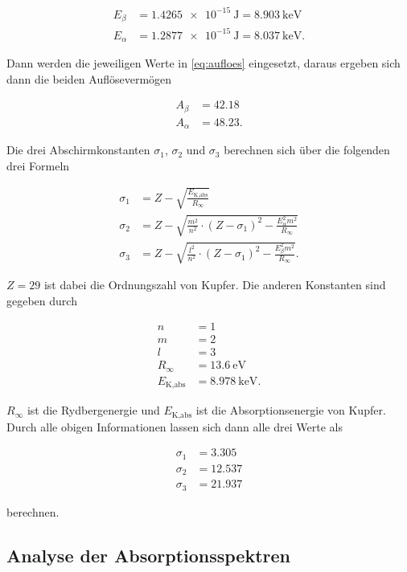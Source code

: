 \begin{align*}
    E_ \beta  &= \SI{1.4265e-15}{\joule} = \SI{8.903}{\kilo\electronvolt}\\
    E_ \alpha &= \SI{1.2877e-15}{\joule} = \SI{8.037}{\kilo\electronvolt}.
\end{align*}

Dann werden die jeweiligen Werte in \eqref{eq:aufloes} eingesetzt, daraus ergeben sich dann die beiden Auflösevermögen

\begin{align*}
    A_ \beta  &= 42.18\\
    A_ \alpha &= 48.23.
\end{align*}

Die drei Abschirmkonstanten $\sigma_1$, $\sigma_2$ und $\sigma_3$ berechnen sich über die folgenden drei Formeln

\begin{align*}
    \sigma_1 &= Z - \sqrt{\frac{E_\text{K,abs}}{R_\infty}}\\
    \sigma_2 &= Z - \sqrt{\frac{m^2}{n^2} \cdot \left(Z - \sigma_1\right)^2 - \frac{E_ \alpha ^2 m^2}{R_\infty}}\\
    \sigma_3 &= Z - \sqrt{\frac{l^2}{n^2} \cdot \left(Z - \sigma_1\right)^2 - \frac{E_ \beta ^2 m^2}{R_\infty}}.
\end{align*}

$Z = 29$ ist dabei die Ordnungszahl von Kupfer.
Die anderen Konstanten sind gegeben durch

\begin{align*}
    n &= 1\\
    m &= 2\\
    l &= 3\\
    R_\infty &= \SI{13.6}{\electronvolt}\\
    E_\text{K,abs} &= \SI{8.978}{\kilo\electronvolt}.
\end{align*}

$R_\infty$ ist die Rydbergenergie und $E_\text{K,abs}$ ist die Absorptionsenergie von Kupfer. \cite{V602} \cite{absorption}
Durch alle obigen Informationen lassen sich dann alle drei Werte als 

\begin{align*}
    \sigma_1 &= 3.305\\
    \sigma_2 &= 12.537\\
    \sigma_3 &= 21.937
\end{align*}

berechnen.

\subsection{Analyse der Absorptionsspektren}
\label{ssec:3}

